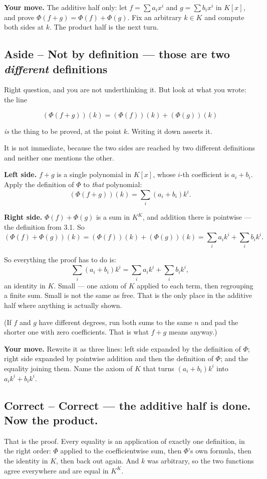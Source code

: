 \documentclass[11pt]{article}
\begin{document}
\textbf{Your move.} The additive half only: let $f = \sum a_ix^i$ and
$g = \sum b_ix^i$ in $K[x]$, and prove $\Phi(f+g) = \Phi(f) + \Phi(g)$. Fix an
arbitrary $k \in K$ and compute both sides at $k$. The product half is the next
turn.


\subsection*{Aside -- Not by definition --- those are two \emph{different} definitions}
Right question, and you are not underthinking it. But look at what you wrote:
the line

$$(\Phi(f+g))(k) = (\Phi(f))(k) + (\Phi(g))(k)$$

\emph{is} the thing to be proved, at the point $k$. Writing it down asserts it.

It is not immediate, because the two sides are reached by two different
definitions and neither one mentions the other.

\textbf{Left side.} $f+g$ is a single polynomial in $K[x]$, whose $i$-th coefficient
is $a_i + b_i$. Apply the definition of $\Phi$ to \emph{that} polynomial:
$$(\Phi(f+g))(k) = \sum_i (a_i + b_i)k^i.$$

\textbf{Right side.} $\Phi(f) + \Phi(g)$ is a sum in $K^K$, and addition there is
pointwise --- the definition from 3.1. So
$$(\Phi(f) + \Phi(g))(k) = (\Phi(f))(k) + (\Phi(g))(k) = \sum_i a_ik^i + \sum_i b_ik^i.$$

So everything the proof has to do is:
$$\sum_i (a_i + b_i)k^i = \sum_i a_ik^i + \sum_i b_ik^i,$$
an identity in $K$. Small --- one axiom of $K$ applied to each term, then
regrouping a finite sum. Small is not the same as free. That is the only place
in the additive half where anything is actually shown.

(If $f$ and $g$ have different degrees, run both sums to the same $n$ and pad
the shorter one with zero coefficients. That is what $f+g$ means anyway.)

\textbf{Your move.} Rewrite it as three lines: left side expanded by the definition
of $\Phi$; right side expanded by pointwise addition and then the definition of
$\Phi$; and the equality joining them. Name the axiom of $K$ that turns
$(a_i + b_i)k^i$ into $a_ik^i + b_ik^i$.


\subsection*{Correct -- Correct --- the additive half is done. Now the product.}
That is the proof. Every equality is an application of exactly one definition,
in the right order: $\Phi$ applied to the coefficientwise sum, then $\Phi$'s own
formula, then the identity in $K$, then back out again. And $k$ was arbitrary,
so the two functions agree everywhere and are equal in $K^K$.
\end{document}
